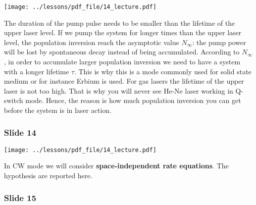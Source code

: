\documentclass[../main/main.tex]{subfiles}
\begin{document}
\begin{minipage}[]{0.5\linewidth}
\centering
\texttt{[image: ../lessons/pdf\_file/14\_lecture.pdf]}
\end{minipage}
\hspace{0.3cm}\vspace{0.3cm}
\begin{minipage}[c]{0.47\linewidth}

The duration of the pump pulse needs to be smaller than the lifetime of the upper laser level. If we pump the system for longer times than the upper laser level, the population inversion reach the asymptotic value \( N_{\infty } \): the pump power will be lost by spontaneous decay instead of being accumulated. According to \( N_{\infty } \), in order to accumulate larger population inversion we need to have a system with a longer lifetime \( \tau  \). This is why this is a mode commonly used for solid state medium or for instance Erbium is used. For gas lasers the lifetime of the upper laser is not too high. That is why you will never see He-Ne laser working in Q-switch mode. Hence, the reason is how much population inversion you can get before the system is in laser action.

\end{minipage}

\subsubsection*{Slide 14}

\begin{minipage}[]{0.5\linewidth}
\centering
\texttt{[image: ../lessons/pdf\_file/14\_lecture.pdf]}
\end{minipage}
\hspace{0.3cm}\vspace{0.3cm}
\begin{minipage}[c]{0.47\linewidth}

In CW mode we will consider \textbf{space-independent rate equations}. The hypothesis are reported here.

\end{minipage}

\subsubsection*{Slide 15}
\end{document}
